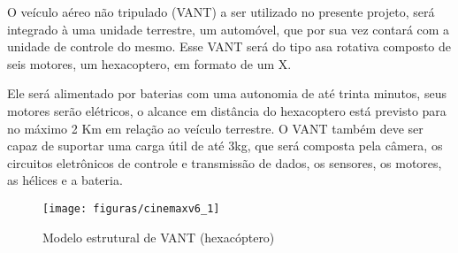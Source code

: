O veículo aéreo não tripulado (VANT) a ser utilizado no presente projeto, será integrado à uma unidade terrestre, um automóvel, que por sua vez contará com a unidade de controle do mesmo. Esse VANT será do tipo asa rotativa composto de seis motores, um hexacoptero, em formato de um X.

Ele será alimentado por baterias com uma autonomia de até trinta minutos, seus motores serão elétricos, o alcance em distância do hexacoptero está previsto para no máximo 2 Km em relação ao veículo terrestre. O VANT também deve ser capaz de suportar uma carga útil de até 3kg, que será composta pela câmera, os circuitos eletrônicos de controle e transmissão de dados, os sensores, os motores, as hélices e a bateria.

\begin{figure}[H]
\centering\texttt{[image: figuras/cinemaxv6\_1]}
\caption{Modelo estrutural de VANT (hexacóptero)}
\end{figure}
